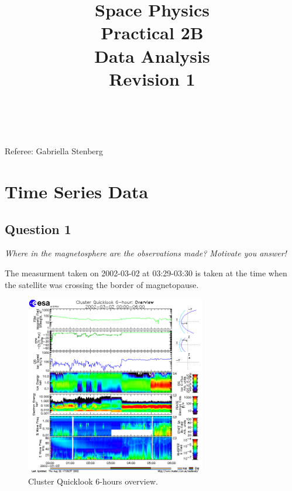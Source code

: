\documentclass{article}
\title{\textbf {Space Physics} \\ Practical 2B\\ Data Analysis\\ Revision 1} %
\author{\authorivan\\\authoranu}
\begin{document}
\maketitle %

\centerline{Referee: Gabriella Stenberg}

\setlength\parindent{0pt} %

\renewcommand{\labelenumi}{\alph{enumi}} %
\clearpage

\tableofcontents

\listoffigures

\clearpage

\section{Time Series Data}

\subsection{Question 1}
\textit{Where in the magnetosphere are the observations made? Motivate you
answer!}

The measurment taken on 2002-03-02 at 03:29-03:30 is taken at the time when the satellite was crossing the border of magnetopause.

\begin{figure}[htb!]
\centering
\includegraphics[width=0.7\textwidth]{Figures/cluster.png}
\caption{Cluster Quicklook 6-hours overview.}
\label{fig:cluster}
\end{figure}
\end{document}
